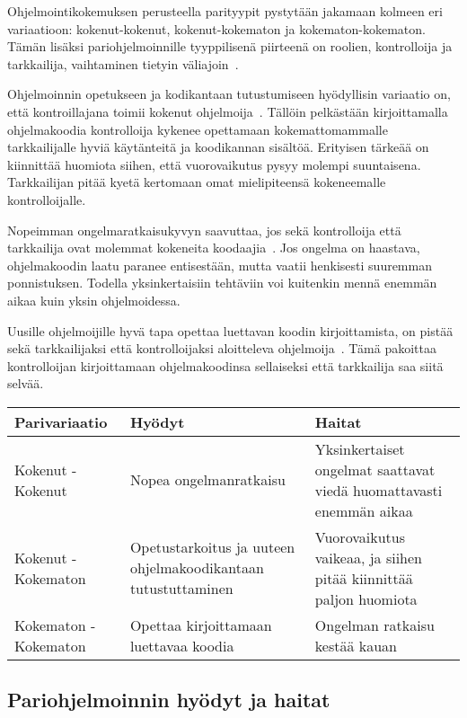 \documentclass[finnish]{tktltiki2}
\theoremstyle{definition}
\theoremstyle{remark}
\begin{document}
Ohjelmointikokemuksen perusteella parityypit pystytään jakamaan kolmeen eri variaatioon: kokenut-kokenut, kokenut-kokematon ja kokematon-kokematon. Tämän lisäksi pariohjelmoinnille tyyppilisenä piirteenä on roolien, kontrolloija ja tarkkailija, vaihtaminen tietyin väliajoin~\cite{williams02support}.

Ohjelmoinnin opetukseen ja kodikantaan tutustumiseen hyödyllisin variaatio on, että kontroillajana toimii kokenut ohjelmoija~\cite{chong2007social}. Tällöin pelkästään kirjoittamalla ohjelmakoodia kontrolloija kykenee opettamaan kokemattomammalle tarkkailijalle hyviä käytänteitä ja koodikannan sisältöä. Erityisen tärkeää on kiinnittää huomiota siihen, että vuorovaikutus pysyy molempi suuntaisena. Tarkkailijan pitää kyetä kertomaan omat mielipiteensä kokeneemalle kontrolloijalle.

Nopeimman ongelmaratkaisukyvyn saavuttaa, jos sekä kontrolloija että tarkkailija ovat molemmat kokeneita koodaajia~\cite{voas2001faster}. Jos ongelma on haastava, ohjelmakoodin laatu paranee entisestään,  mutta vaatii henkisesti suuremman ponnistuksen. Todella yksinkertaisiin tehtäviin voi kuitenkin mennä enemmän aikaa kuin yksin ohjelmoidessa.

Uusille ohjelmoijille hyvä tapa opettaa luettavan koodin kirjoittamista, on pistää sekä tarkkailijaksi että kontrolloijaksi aloitteleva ohjelmoija~\cite{chong2007social}. Tämä pakoittaa kontrolloijan kirjoittamaan ohjelmakoodinsa sellaiseksi että tarkkailija saa siitä selvää.

\begin{center}
    \begin{tabular}{ | p{} | p{5cm} | p{4cm} | }
    \hline
   	Parivariaatio & Hyödyt & Haitat \\ \hline
    	Kokenut - Kokenut & Nopea ongelmanratkaisu & Yksinkertaiset ongelmat saattavat viedä huomattavasti enemmän aikaa\\ \hline
	Kokenut - Kokematon & Opetustarkoitus ja uuteen ohjelmakoodikantaan tutustuttaminen & Vuorovaikutus vaikeaa, ja siihen pitää kiinnittää paljon huomiota\\ \hline
	Kokematon - Kokematon & Opettaa kirjoittamaan luettavaa koodia & Ongelman ratkaisu kestää kauan \\ \hline
    \end{tabular}
\end{center}


\subsection{Pariohjelmoinnin hyödyt ja haitat}
\end{document}
